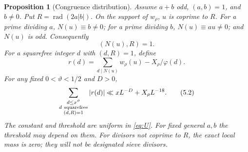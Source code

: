 \documentclass[11pt]{article}
\newtheorem{proposition}[theorem]{Proposition}
\theoremstyle{definition}
\theoremstyle{definition}
\begin{document}
\begin{proposition}[Congruence distribution]\label{prop:congruence}
Assume \(a+b\) odd, \((a,b)=1\), and \(b\ne0\). Put \(R=\operatorname{rad}(2a|b|)\). On the support of \(w_\rho\), \(u\) is coprime to \(R\). For a prime dividing \(a\), \(N(u)\equiv b\ne0\); for a prime dividing \(b\), \(N(u)\equiv au\ne0\); and \(N(u)\) is odd. Consequently
\begin{equation}
(N(u),R)=1.                                           \tag{5.1}\label{eq:5-1}
\end{equation}
For a squarefree integer \(d\) with \((d,R)=1\), define
\begin{equation*}
r(d)=\sum_{d\mid N(u)}w_\rho(u)-X_\rho/\varphi(d).
\end{equation*}
For any fixed \(0<\vartheta<1/2\) and \(D>0\),
\begin{equation}
\sum_{\substack{d\le x^\vartheta\\d\ {\rm squarefree}\\(d,R)=1}}
 |r(d)|\ll xL^{-D}+X_\rho L^{-18}.                      \tag{5.2}\label{eq:5-2}
\end{equation}
The constant and threshold are uniform in \eqref{eq:U}. For fixed general \(a,b\) the threshold may depend on them. For divisors not coprime to \(R\), the exact local mass is zero; they will not be designated sieve divisors. 

\end{proposition}
\end{document}
